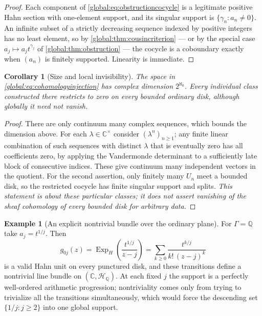\documentclass[11pt,letterpaper]{article}
\newtheorem{corollary}[corollary]{Corollary}
\theoremstyle{definition}
\newtheorem{example}[example]{Example}
\theoremstyle{remark}
\newcommand{\C}{\mathbb C}
\newcommand{\Q}{\mathbb Q}
\newcommand{\ExpH}{\operatorname{Exp}_{H}}
\numberwithin{equation}{section}
\begin{document}
\begin{proof}
Each component of \eqref{global:eq:obstructioncocycle} is a legitimate positive Hahn section with one-element support, and its singular support is $\{\gamma_n:a_n\ne0\}$. An infinite subset of a strictly decreasing sequence indexed by positive integers has no least element, so by \cref{global:thm:cousincriterion} --- or by the special case $a_j\mapsto a_jt^{\gamma_j}$ of \cref{global:thm:obstruction} --- the cocycle is a coboundary exactly when $(a_n)$ is finitely supported. Linearity is immediate.
\end{proof}

\begin{corollary}[Size and local invisibility]\label{global:cor:H1size}
The space in \eqref{global:eq:cohomologyinjection} has complex dimension $2^{\aleph_0}$. Every individual class constructed there restricts to zero on every bounded ordinary disk, although globally it need not vanish.
\end{corollary}

\begin{proof}
There are only continuum many complex sequences, which bounds the dimension above. For each $\lambda\in\C^\times$ consider $(\lambda^n)_{n\ge1}$; any finite linear combination of such sequences with distinct $\lambda$ that is eventually zero has all coefficients zero, by applying the Vandermonde determinant to a sufficiently late block of consecutive indices. These give continuum many independent vectors in the quotient. For the second assertion, only finitely many $U_n$ meet a bounded disk, so the restricted cocycle has finite singular support and splits. \emph{This statement is about these particular classes; it does not assert vanishing of the sheaf cohomology of every bounded disk for arbitrary data.}
\end{proof}

\begin{example}[An explicit nontrivial bundle over the ordinary plane]\label{global:ex:bundle}
For $\Gamma=\Q$ take $a_j=t^{1/j}$. Then
\[
  g_{0j}(z)=\ExpH\!\left(\frac{t^{1/j}}{z-j}\right)
  =\sum_{k\ge0}\frac{t^{k/j}}{k!\,(z-j)^k}
\]
is a valid Hahn unit on every punctured disk, and these transitions define a nontrivial line bundle on $(\C,\mathscr H_\Q)$. At each fixed $j$ the support is a perfectly well-ordered arithmetic progression; nontriviality comes only from trying to trivialize all the transitions simultaneously, which would force the descending set $\{1/j:j\ge2\}$ into one global support.
\end{example}
\end{document}
